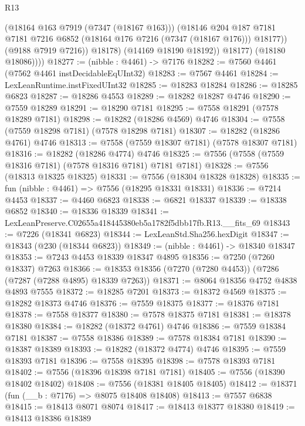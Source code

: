 \begin{lexlean}{R13}
\begin{coremodule}
                    (@18164 @163 @7919 (@7347 (@18167 @163)))
                    (@18146
                      @204
                      @187
                      @7181
                      @7181
                      @7216
                      @6852
                      (@18164 @176 @7216 (@7347 (@18167 @176)))
                      @18177))
                  (@9188 @7919 @7216))
                @18178)
              (@14169 @18190 @18192))
            @18177)
          (@18180 @18086))))
@18277 := (nibble : @4461) -> @7176
@18282 := @7560 @4461 (@7562 @4461 instDecidableEqUInt32)
@18283 := @7567 @4461
@18284 := LexLeanRuntime.instFixedUInt32
@18285 := @18283 @18284
@18286 := @18285 @6823
@18287 := @18286 @4553
@18289 := @18282 @18287 @4746
@18290 := @7559 @18289
@18291 := @18290 @7181
@18295 := @7558 @18291 (@7578 @18289 @7181)
@18298 := @18282 (@18286 @4569) @4746
@18304 := @7558 (@7559 @18298 @7181) (@7578 @18298 @7181)
@18307 := @18282 (@18286 @4761) @4746
@18313 := @7558 (@7559 @18307 @7181) (@7578 @18307 @7181)
@18316 := @18282 (@18286 @4774) @4746
@18325 := @7556 (@7558 (@7559 @18316 @7181) (@7578 @18316 @7181) @7181 @7181)
@18328 := @7556 (@18313 @18325 @18325)
@18331 := @7556 (@18304 @18328 @18328)
@18335 := fun (nibble : @4461) => @7556 (@18295 @18331 @18331)
@18336 := @7214 @4453
@18337 := @4460 @6823
@18338 := @6821 @18337
@18339 := @18338 @6852
@18340 := @18336 @18339
@18341 := LexLeanPreserve.C02655a418445380eb5a1782f5dbb17fb.R13.__fits_69
@18343 := @7226 (@18341 @6823)
@18344 := LexLeanStd.Sha256.hexDigit
@18347 := @18343 (@230 (@18344 @6823))
@18349 := (nibble : @4461) -> @18340 @18347
@18353 := @7243 @4453 @18339 @18347 @4895
@18356 := @7250 (@7260 @18337) @7263
@18366 := @18353 @18356 (@7270 (@7280 @4453)) (@7286 (@7287 (@7288 @4895) @18339 @7263))
@18371 := @8064 @18356 @4752 @4838 @4893 @7555
@18372 := @18285 @7201
@18373 := @18372 @4569
@18375 := @18282 @18373 @4746
@18376 := @7559 @18375
@18377 := @18376 @7181
@18378 := @7558 @18377
@18380 := @7578 @18375 @7181
@18381 := @18378 @18380
@18384 := @18282 (@18372 @4761) @4746
@18386 := @7559 @18384 @7181
@18387 := @7558 @18386
@18389 := @7578 @18384 @7181
@18390 := @18387 @18389
@18393 := @18282 (@18372 @4774) @4746
@18395 := @7559 @18393 @7181
@18396 := @7558 @18395
@18398 := @7578 @18393 @7181
@18402 := @7556 (@18396 @18398 @7181 @7181)
@18405 := @7556 (@18390 @18402 @18402)
@18408 := @7556 (@18381 @18405 @18405)
@18412 := @18371 (fun (__b : @7176) => @8075 @18408 @18408)
@18413 := @7557 @6838
@18415 := @18413 @8071 @8074
@18417 := @18413 @18377 @18380
@18419 := @18413 @18386 @18389

\end{coremodule}
\end{lexlean}
